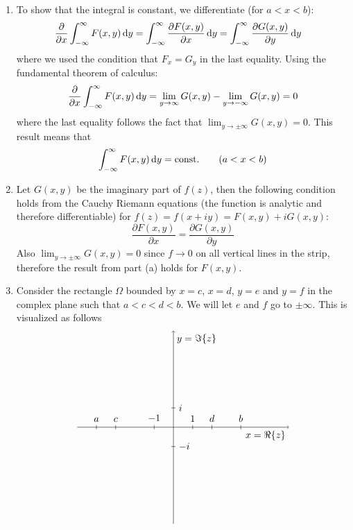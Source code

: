 \begin{solution}
    \begin{enumerate}[label=(\alph*)]
        \item To show that the integral is constant, we differentiate (for $a<x<b$):
        \begin{align*}
            \frac{\partial}{\partial x} \int_{-\infty}^\infty F(x,y) \mathop{}\!\mathrm{d} y &= \int_{-\infty}^\infty \frac{\partial{F(x,y)}}{\partial x} \mathop{}\!\mathrm{d} y = \int_{-\infty}^\infty \frac{\partial{G(x,y)}}{\partial y} \mathop{}\!\mathrm{d} y 
        \end{align*}
        where we used the condition that $F_x=G_y$ in the last equality.
        Using the fundamental theorem of calculus:
        \[
            \frac{\partial}{\partial x} \int_{-\infty}^\infty F(x,y) \mathop{}\!\mathrm{d} y = \lim_{y\to\infty} G(x,y) - \lim_{y\to-\infty}G(x, y) = 0
        \]
        where the last equality follows the fact that $\lim_{y\to\pm\infty} G(x,y)=0$. This result means that
        \[
            \int_{-\infty}^{\infty} F(x,y) \mathop{}\!\mathrm{d} y = \textnormal{const.} \qquad (a < x < b)
        \]
        \item Let $G(x,y)$ be the imaginary part of $f(z)$, then the following condition holds from the Cauchy Riemann equations (the function is analytic and therefore differentiable) for $f(z) = f(x+iy) = F(x,y) + iG(x,y)$:
        \[
            \frac{\partial F(x,y)}{\partial x} = \frac{\partial G(x,y)}{\partial y}
        \]
        Also $\lim_{y\to\pm\infty} G(x,y) = 0$ since $f\to 0$ on all vertical lines in the strip, therefore the result from part (a) holds for $F(x,y)$.
        \item Consider the rectangle $\Omega$ bounded by $x=c$, $x=d$, $y=e$ and $y=f$ in the complex plane such that $a < c < d < b$. We will let $e$ and $f$ go to $\pm \infty$. This is visualized as follows
        \[\begin{tikzpicture}
            \begin{scope}[scale=0.7]
            \draw [->] (-5,0) -- (6,0) node [below left]  {$x = \Re\{z\}$};
            \draw [->] (0,-5) -- (0,5) node [below right] {$y = \Im\{z\}$};
        
            \draw (1,-3pt) -- (1,3pt)   node [above] {$1$};
            \draw (-1,-3pt) -- (-1,3pt) node [above] {$-1$};
            \draw (-3pt,1) -- (3pt,1)   node [right] {$i$};
            \draw (-3pt,-1) -- (3pt,-1) node [right] {$-i$};
            \draw (-3,-3pt) -- (-3,3pt) node [above] {$c$};
            \draw (2,-3pt) -- (2,3pt) node [above] {$d$};
            \draw (-4,-3pt) -- (-4,3pt) node [above] {$a$};
            \draw (3.5,-3pt) -- (3.5,3pt) node [above] {$b$};


\end{scope}
\end{tikzpicture}\]
\end{enumerate}
\end{solution}
